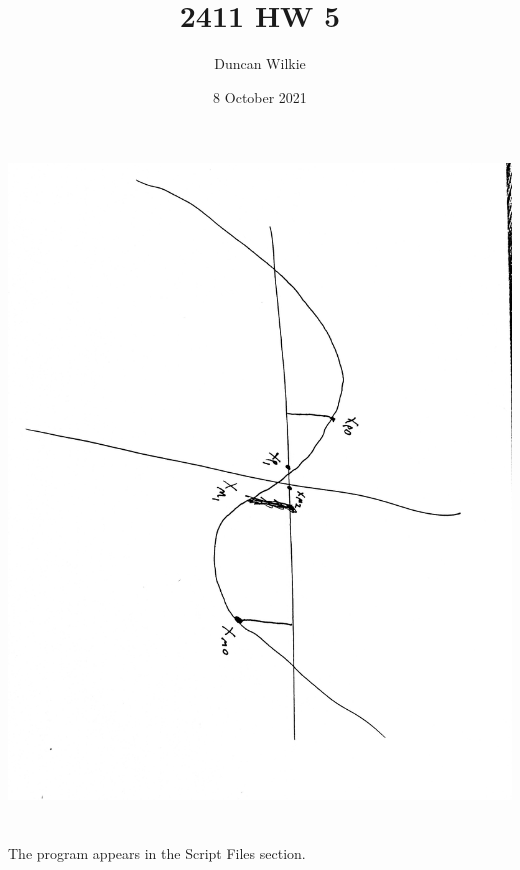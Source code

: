 \documentclass{article}
\title{2411 HW 5}
\author{Duncan Wilkie}
\date{8 October 2021}
\begin{document}
\maketitle

\section{}
\includegraphics[scale = 0.1, angle=90]{p1.jpg}
\section{}
The program appears in the Script Files section.
\newpage
\end{document}
